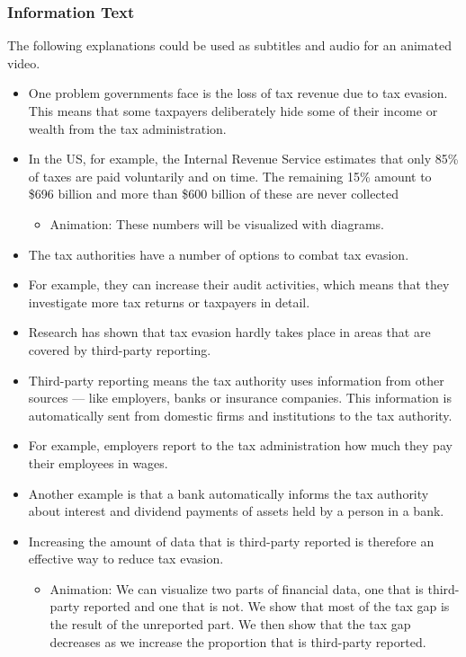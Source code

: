 \documentclass[11pt]{article}
\begin{document}
\subsubsection*{Information Text}
The following explanations could be used as subtitles and audio for an animated video.
\begin{itemize}
\item One problem governments face is the loss of tax revenue due to tax evasion. This means that some taxpayers deliberately hide some of their income or wealth from the tax administration. 
\item In the US, for example, the Internal Revenue Service estimates that only 85\% of taxes are paid voluntarily and on time. The remaining 15\% amount to \$696 billion and more than \$600 billion of these are never collected
\begin{itemize}
    \item Animation: These numbers will be visualized with diagrams.
\end{itemize}
\item The tax authorities have a number of options to combat tax evasion.
\item For example, they can increase their audit activities, which means that they investigate more tax returns or taxpayers in detail.  
\item Research has shown that tax evasion hardly takes place in areas that are covered by third-party reporting.
\item Third-party reporting means the tax authority uses information from other sources --- like employers, banks or insurance companies. This information is automatically sent from domestic firms and institutions to the tax authority.
\item For example, employers report to the tax administration how much they pay their employees in wages.
\item Another example is that a bank automatically informs the tax authority about interest and dividend payments of assets held by a person in a bank.
\item Increasing the amount of data that is third-party reported is therefore an effective way to reduce tax evasion.
\begin{itemize}
    \item Animation: We can visualize two parts of financial data, one that is third-party reported and one that is not. We show that most of the tax gap is the result of the unreported part. We then show that the tax gap decreases as we increase the proportion that is third-party reported.

\end{itemize}
\end{itemize}
\end{document}
